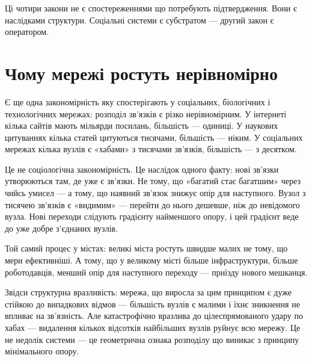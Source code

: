 \documentclass[12pt, a4paper, openany]{book}
\begin{document}
Ці чотири закони не є спостереженнями що потребують підтвердження. Вони є наслідками структури. Соціальні системи є субстратом --- другий закон є оператором.

\section{Чому мережі ростуть нерівномірно}

Є ще одна закономірність яку спостерігають у соціальних, біологічних і технологічних мережах: розподіл зв'язків є різко нерівномірним. У інтернеті кілька сайтів мають мільярди посилань, більшість --- одиниці. У наукових цитуваннях кілька статей цитуються тисячами, більшість --- ніким. У соціальних мережах кілька вузлів є «хабами» з тисячами зв'язків, більшість --- з десятком.

Це не соціологічна закономірність. Це наслідок одного факту: нові зв'язки утворюються там, де уже є зв'язки. Не тому, що «багатий стає багатшим» через чийсь умисел --- а тому, що наявний зв'язок знижує опір для наступного. Вузол з тисячею зв'язків є «видимим» --- перейти до нього дешевше, ніж до невідомого вузла. Нові переходи слідують градієнту найменшого опору, і цей градієнт веде до уже добре з'єднаних вузлів.

\begin{analogybox}
Той самий процес у містах: великі міста ростуть швидше малих не тому, що мери ефективніші. А тому, що у великому місті більше інфраструктури, більше роботодавців, менший опір для наступного переходу --- приїзду нового мешканця.
\end{analogybox}

Звідси структурна вразливість: мережа, що виросла за цим принципом є дуже стійкою до випадкових відмов --- більшість вузлів є малими і їхнє зникнення не впливає на зв'язність. Але катастрофічно вразлива до цілеспрямованого удару по хабах --- видалення кількох відсотків найбільших вузлів руйнує всю мережу. Це не недолік системи --- це геометрична ознака розподілу що виникає з принципу мінімального опору.
\end{document}
